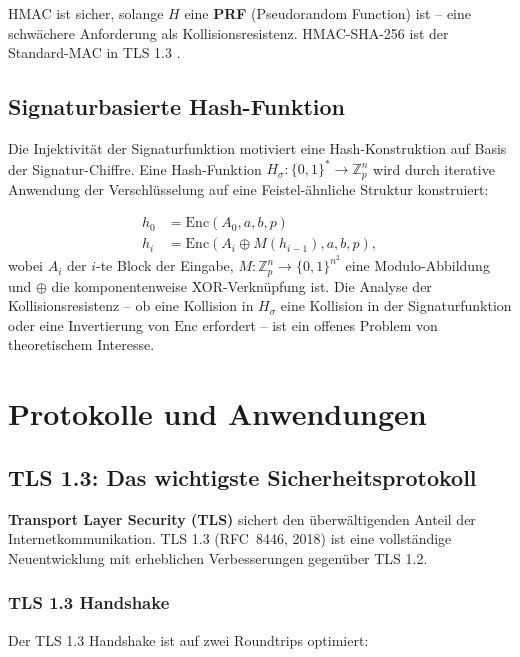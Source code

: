 ﻿\documentclass[a4paper,12pt]{scrreprt}
\theoremstyle{definition}
\begin{document}
HMAC ist sicher, solange $H$ eine \textbf{PRF} (Pseudorandom Function) ist -- eine schwächere Anforderung als Kollisionsresistenz. HMAC-SHA-256 ist der Standard-MAC in TLS 1.3 \cite{Res18}.

\subsection{Signaturbasierte Hash-Funktion}

Die Injektivität der Signaturfunktion motiviert eine Hash-Konstruktion auf Basis der Signatur-Chiffre. Eine Hash-Funktion $H_\sigma: \{0,1\}^* \to \mathbb{Z}_p^n$ wird durch iterative Anwendung der Verschlüsselung auf eine Feistel-ähnliche Struktur konstruiert:

\begin{align*}
h_0 &= \mathrm{Enc}(A_0, a, b, p) \\
h_i &= \mathrm{Enc}(A_i \oplus M(h_{i-1}), a, b, p),
\end{align*}
wobei $A_i$ der $i$-te Block der Eingabe, $M: \mathbb{Z}_p^n \to \{0,1\}^{n^2}$ eine Modulo-Abbildung und $\oplus$ die komponentenweise XOR-Verknüpfung ist. Die Analyse der Kollisionsresistenz -- ob eine Kollision in $H_\sigma$ eine Kollision in der Signaturfunktion oder eine Invertierung von $\mathrm{Enc}$ erfordert -- ist ein offenes Problem von theoretischem Interesse.

\section{Protokolle und Anwendungen}

\subsection{TLS 1.3: Das wichtigste Sicherheitsprotokoll}

\textbf{Transport Layer Security (TLS)} \cite{Res18} sichert den überwältigenden Anteil der Internetkommunikation. TLS 1.3 (RFC~8446, 2018) ist eine vollständige Neuentwicklung mit erheblichen Verbesserungen gegenüber TLS 1.2.

\subsubsection{TLS 1.3 Handshake}

Der TLS 1.3 Handshake ist auf zwei Roundtrips optimiert:
\end{document}
